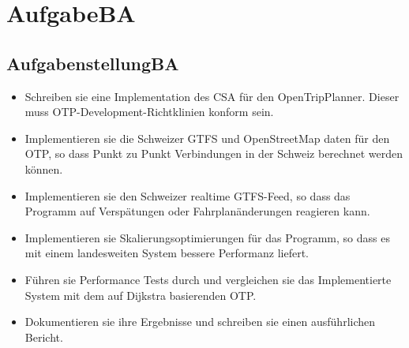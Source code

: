 \section[AufgabeBA]{AufgabeBA}
\label{AufgabeBA}


\subsection{AufgabenstellungBA}
\label{AufgabenstellungBA}
\begin{itemize}
	\item Schreiben sie eine Implementation des CSA für den OpenTripPlanner. Dieser muss OTP-Development-Richtklinien konform sein.
	\item Implementieren sie die Schweizer GTFS und OpenStreetMap daten für den OTP, so dass Punkt zu Punkt Verbindungen in der Schweiz berechnet werden können.
	\item Implementieren sie den Schweizer realtime GTFS-Feed, so dass das Programm auf Verspätungen oder Fahrplanänderungen reagieren kann.
	\item Implementieren sie Skalierungsoptimierungen für das Programm, so dass es mit einem landesweiten System bessere Performanz liefert.
	\item Führen sie Performance Tests durch und vergleichen sie das Implementierte System mit dem auf Dijkstra basierenden OTP.
	\item Dokumentieren sie ihre Ergebnisse und schreiben sie einen ausführlichen Bericht.
\end{itemize}

